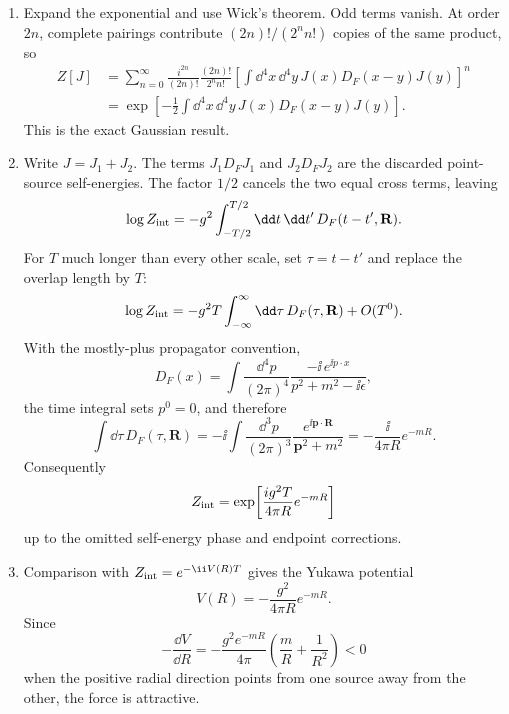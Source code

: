 \begin{enumerate}
\begin{enumerate}
\item
Expand the exponential and use Wick's theorem.  Odd terms vanish.  At
order \(2n\), complete pairings contribute
\((2n)!/(2^n n!)\) copies of the same product, so
\[
\begin{split}
 Z[J]
 &=\sum_{n=0}^\infty
 \frac{i^{2n}}{(2n)!}\frac{(2n)!}{2^n n!}
 \left[\int \dd^4x\,\dd^4y\,
 J(x)D_F(x-y)J(y)\right]^n\\
 &=\exp\!\left[-\frac12\int \dd^4x\,\dd^4y\,
 J(x)D_F(x-y)J(y)\right].
\end{split}
\]
This is the exact Gaussian result.
\item
Write \(J=J_1+J_2\).  The terms \(J_1D_FJ_1\) and \(J_2D_FJ_2\)
are the discarded point-source self-energies.  The factor \(1/2\)
cancels the two equal cross terms, leaving
\[
 \log Z_{\rm int}
 =-g^2\int_{-T/2}^{T/2}\dd t\,\dd t'\,
 D_F(t-t',\mathbf R).
\]
For \(T\) much longer than every other scale, set
\(\tau=t-t'\) and replace the overlap length by \(T\):
\[
 \log Z_{\rm int}
 =-g^2T\int_{-\infty}^{\infty}\dd\tau\,
 D_F(\tau,\mathbf R)+O(T^0).
\]
With the mostly-plus propagator convention,
\[
 D_F(x)=\int\frac{\dd^4p}{(2\pi)^4}
 \frac{-\ii\,e^{\ii p\cdot x}}{p^2+m^2-\ii\epsilon},
\]
the time integral sets \(p^0=0\), and therefore
\[
 \int \dd\tau\,D_F(\tau,\mathbf R)
 =-\ii\int\frac{\dd^3p}{(2\pi)^3}
 \frac{e^{\ii\mathbf p\cdot\mathbf R}}{\mathbf p^2+m^2}
 =-\frac{\ii}{4\pi R}e^{-mR}.
\]
Consequently
\[
 Z_{\rm int}
 =\exp\!\left[\frac{ig^2T}{4\pi R}e^{-mR}\right]
\]
up to the omitted self-energy phase and endpoint corrections.
\item
Comparison with \(Z_{\rm int}=e^{-\ii V(R)T}\) gives the Yukawa potential
\[
 V(R)=-\frac{g^2}{4\pi R}e^{-mR}.
\]
Since
\[
 -\frac{\dd V}{\dd R}
 =-\frac{g^2e^{-mR}}{4\pi}
 \left(\frac{m}{R}+\frac1{R^2}\right)<0
\]
when the positive radial direction points from one source away from the
other, the force is attractive.
\end{enumerate}
\end{enumerate}
